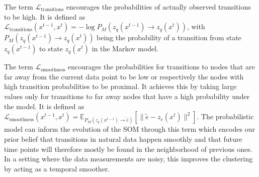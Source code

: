 The term $\mathcal{L}_{\text{transitions}}$ encourages the probabilities of actually observed transitions to be high.
It is defined as $\mathcal{L}_{\text{transitions}}(x^{t-1}, x^t) = - \log P_{M} (z_q(x^{t-1}) \rightarrow z_q(x^t))$, with $P_{M} (z_q(x^{t-1}) \rightarrow z_q(x^t))$ being the probability of a transition from state $z_q(x^{t-1})$ to state $z_q(x^t)$ in the Markov model.

The term $\mathcal{L}_{\text{smoothness}}$ encourages the probabilities for transitions to nodes that are far away from the current data point to be low or respectively the nodes with high transition probabilities to be proximal.
It achieves this by taking large values only for transitions to far away nodes that have a high probability under the model.
It is defined as $\mathcal{L}_{\text{smoothness}}(x^{t-1}, x^t) = \mathbb{E}_{P_{M} \left( z_q(x^{t-1}) \rightarrow \tilde{e} \right) } \left[ \| \tilde{e} - z_e(x^t) \|^2 \right]$.
The probabilistic model can inform the evolution of the SOM through this term which encodes our prior belief that transitions in natural data happen smoothly and that future time points will therefore mostly be found in the neighborhood of previous ones.
In a setting where the data measurements are noisy, this improves the clustering by acting as a temporal smoother.

